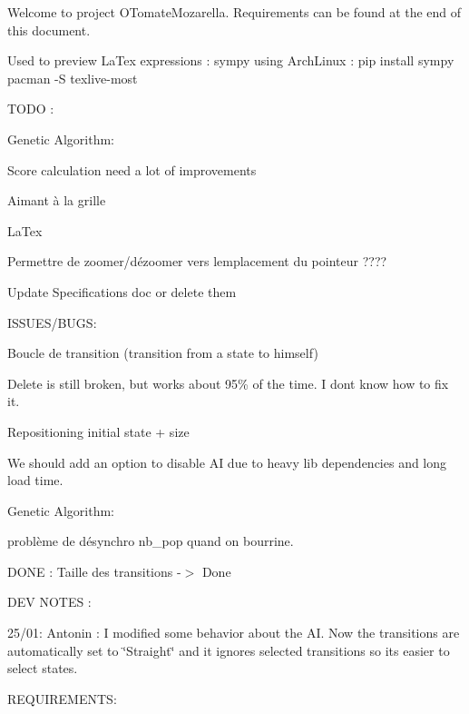 Welcome to project O\+Tomate\+Mozarella. Requirements can be found at the end of this document.

Used to preview La\+Tex expressions \+: sympy using Arch\+Linux \+: pip install sympy pacman -\/S texlive-\/most

T\+O\+DO \+:
\begin{DoxyItemize}
\item Genetic Algorithm\+:
\begin{DoxyItemize}
\item Score calculation need a lot of improvements
\end{DoxyItemize}
\item Aimant à la grille
\item La\+Tex
\item Permettre de zoomer/dézoomer vers l\textquotesingle{}emplacement du pointeur ????
\item Update Specifications doc or delete them
\end{DoxyItemize}

I\+S\+S\+U\+E\+S/\+B\+U\+GS\+:
\begin{DoxyItemize}
\item Boucle de transition (transition from a state to himself)
\item Delete is still broken, but works about 95\% of the time. I don\textquotesingle{}t know how to fix it.
\item Repositioning initial state + size
\item We should add an option to disable AI due to heavy lib dependencies and long load time.
\item Genetic Algorithm\+:
\begin{DoxyItemize}
\item problème de désynchro nb\+\_\+pop quand on bourrine.
\end{DoxyItemize}
\end{DoxyItemize}

D\+O\+NE \+: Taille des transitions -\/$>$ Done

D\+EV N\+O\+T\+ES \+:

25/01\+: Antonin \+: I modified some behavior about the AI. Now the transitions are automatically set to \char`\"{}\+Straight\char`\"{} and it ignores selected transitions so it\textquotesingle{}s easier to select states.

R\+E\+Q\+U\+I\+R\+E\+M\+E\+N\+TS\+:


